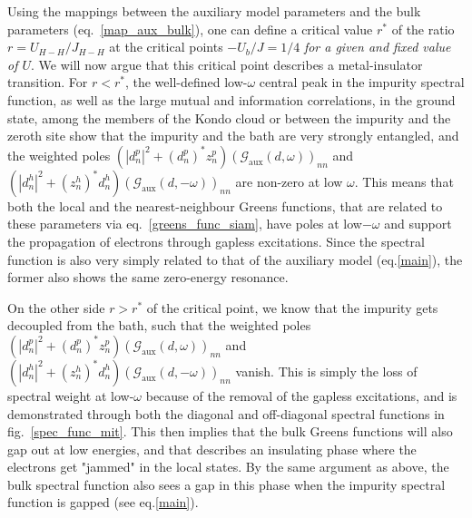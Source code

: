 \documentclass[10pt]{report}
\numberwithin{equation}{section}
\begin{document}
\begin{itemize}
Using the mappings between the auxiliary model parameters and the bulk parameters (eq.~\ref{map_aux_bulk}), one can define a critical value \(r^{*}\) of the ratio \(r = U_{H-H}/J_{H-H}\) at the critical points \(-U_b/J=1/4\) \textit{for a given and fixed value of \(U\)}. We will now argue that this critical point describes a metal-insulator transition. For \(r < r^{*}\), the well-defined low-\(\omega\) central peak in the impurity spectral function, as well as the large mutual and information correlations, in the ground state, among the members of the Kondo cloud or between the impurity and the zeroth site show that the impurity and the bath are very strongly entangled, and the weighted poles \(\left(|d^p_n|^2 + \left(d^p_n\right)^* z^p_n\right) \left(\mathcal{G}_\text{aux}(d, \omega)\right)_{nn}\) and \(\left(|d^h_n|^2 + \left(z^h_n\right)^* d^h_n\right)\left(\mathcal{G}_\text{aux}(d, -\omega)\right)_{nn}\) are non-zero at low \(\omega\). This means that both the local and the nearest-neighbour Greens functions, that are related to these parameters via eq.~\ref{greens_func_siam}, have poles at low\(-\omega\) and support the propagation of electrons through gapless excitations. Since the spectral function is also very simply related to that of the auxiliary model (eq.\eqref{main}), the former also shows the same zero-energy resonance.

On the other side \(r > r^{*}\) of the critical point, we know that the impurity gets decoupled from the bath, such that the weighted poles \(\left(|d^p_n|^2 + \left(d^p_n\right)^* z^p_n\right) \left(\mathcal{G}_\text{aux}(d, \omega)\right)_{nn}\) and \(\left(|d^h_n|^2 + \left(z^h_n\right)^* d^h_n\right)\left(\mathcal{G}_\text{aux}(d, -\omega)\right)_{nn}\) vanish. This is simply the loss of spectral weight at low-\(\omega\) because of the removal of the gapless excitations, and is demonstrated through both the diagonal and off-diagonal spectral functions in fig.~\ref{spec_func_mit}. This then implies that the bulk Greens functions will also gap out at low energies, and that describes an insulating phase where the electrons get "jammed" in the local states. By the same argument as above, the bulk spectral function also sees a gap in this phase when the impurity spectral function is gapped (see eq.\eqref{main}).


\end{itemize}
\end{document}
